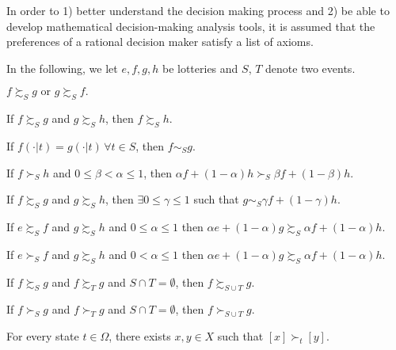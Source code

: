 In order to 1) better understand the decision making process and 2) be able to develop mathematical decision-making analysis tools, it is assumed that the preferences of a rational decision maker satisfy a list of axioms.

In the following, we let $e, f, g, h$ be lotteries and $S$, $T$ denote two events.

\begin{axiom}[Completeness]
$f \succsim_S g \text{ or } g \succsim_S f.$
\end{axiom} 
\begin{axiom}[Transitivity]
If $f \succsim_S g$ and $g \succsim_S h$, then $f \succsim_S h$.
\end{axiom} 
\begin{axiom}[Relevance]
If $f(\cdot | t) = g(\cdot | t) \, \forall t \in S$, then $f \sim_S g$. 
\end{axiom}
\begin{axiom}[Monotonicity]
If $f \succ_S h$ and $0 \leq \beta < \alpha \leq 1$, then $\alpha f + (1-\alpha) h \succ_S \beta f + (1-\beta) h$. 
\end{axiom}
\begin{axiom}[Continuity]
If $f \succsim_S g$ and $g \succsim_S h$, then $\exists 0 \leq \gamma \leq 1$ such that $g \sim_S \gamma f + (1-\gamma) h$.
\end{axiom}
\begin{axiom}
If $e \succsim_S f$ and $g \succsim_S h$ and $ 0 \leq \alpha \leq 1$ then $\alpha e + (1-\alpha) g \succsim_S \alpha f + (1-\alpha) h.$
\end{axiom}
\begin{axiom}
If $e \succ_S f$ and $g \succsim_S h$ and $ 0 < \alpha \leq 1$ then $\alpha e + (1-\alpha) g \succsim_S \alpha f + (1-\alpha) h.$
\end{axiom}
\begin{axiom}
If $f \succsim_S g$ and $f \succsim_T g$ and $S \cap T = \emptyset$, then $f \succsim_{S \cup T} g$.
\end{axiom}
\begin{axiom}
If $f \succ_S g$ and $f \succ_T g$ and $S \cap T = \emptyset$, then $f \succ_{S \cup T} g$.
\end{axiom}
\begin{axiom}[Interest]
For every state $t \in \Omega$, there exists $x, y \in X$ such that $[x] \succ_t [y]$.
\end{axiom}

